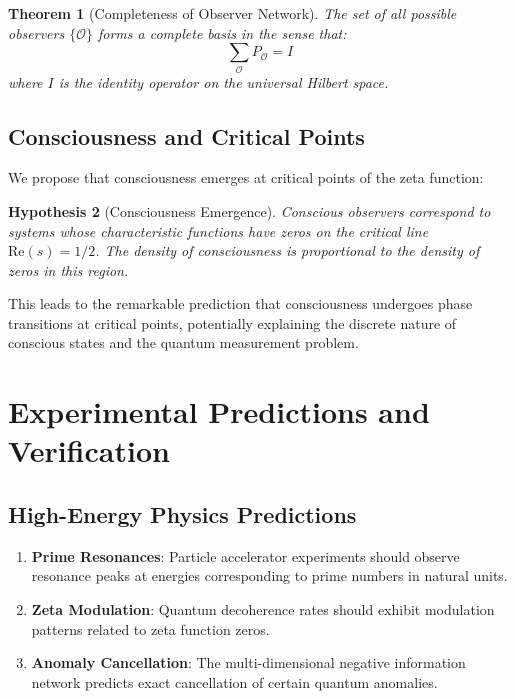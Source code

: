 \documentclass[12pt]{article}
\theoremstyle{plain}
\newtheorem{theorem}{Theorem}[section]
\newtheorem{hypothesis}[theorem]{Hypothesis}
\theoremstyle{definition}
\newcommand{\cO}{\mathcal{O}}
\newcommand{\Re}{\text{Re}}
\begin{document}
\begin{theorem}[Completeness of Observer Network]
The set of all possible observers $\{\cO\}$ forms a complete basis in the sense that:
\begin{equation}
\sum_{\cO} P_{\cO} = I
\end{equation}
where $I$ is the identity operator on the universal Hilbert space.
\end{theorem}

\subsection{Consciousness and Critical Points}

We propose that consciousness emerges at critical points of the zeta function:

\begin{hypothesis}[Consciousness Emergence]
Conscious observers correspond to systems whose characteristic functions have zeros on the critical line $\Re(s) = 1/2$. The density of consciousness is proportional to the density of zeros in this region.
\end{hypothesis}

This leads to the remarkable prediction that consciousness undergoes phase transitions at critical points, potentially explaining the discrete nature of conscious states and the quantum measurement problem.

\section{Experimental Predictions and Verification}

\subsection{High-Energy Physics Predictions}

\begin{enumerate}
\item \textbf{Prime Resonances}: Particle accelerator experiments should observe resonance peaks at energies corresponding to prime numbers in natural units.

\item \textbf{Zeta Modulation}: Quantum decoherence rates should exhibit modulation patterns related to zeta function zeros.

\item \textbf{Anomaly Cancellation}: The multi-dimensional negative information network predicts exact cancellation of certain quantum anomalies.
\end{enumerate}
\end{document}
